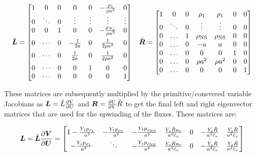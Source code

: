 \documentclass[10pt]{article}
\begin{document}
\begin{flushleft}
\begin{equation*}
    \tilde{\boldsymbol{L}} = \begin{bmatrix}
        1 & 0 & 0 & 0 & 0 & -\frac{\rho_1}{\rho a^2} & 0 \\
        0 & \ddots & 0 & \vdots & \vdots & \vdots & \vdots \\
        0 & 0 & 1 & 0 & 0 & -\frac{\rho_{N_s}}{\rho a^2} & 0 \\[2mm]
        0 & \cdots & 0 & -\frac{1}{2a} & 0 & \frac{1}{2\rho a^2} & 0 \\[2mm]
        0 & \cdots & 0 & \frac{1}{2a} & 0 & \frac{1}{2\rho a^2} & 0 \\[2mm]
        0 & \cdots & 0 & 0 & 1 & 0 & 0 \\
        0 & \cdots & 0 & 0 & 0 & 0 & 1
    \end{bmatrix}
    \hspace{3mm}
    \tilde{\boldsymbol{R}} = \begin{bmatrix}
        1 & 0 & 0 & \rho_1 & \rho_1 & 0 & 0 \\
        0 & \ddots & 0 & \vdots & \vdots & 0 & 0 \\
        0 & \dots & 1 & \rho_\text{NS} & \rho_\text{NS} & 0 & 0 \\
        0 & \dots & 0 & -a & a & 0 & 0  \\
        0 & \dots & 0 & 0 & 0 & 1 & 0 \\
        0 & \dots & 0 & \rho a^2 & \rho a^2 & 0 & 0 \\
        0 & \dots & 0 & 0 & 0 & 0 & 1
    \end{bmatrix}
\end{equation*}

These matrices are subsequently multiplied by the primitive/consvered variable Jacobians as $\boldsymbol{L} = \tilde{L} \frac{\partial V}{\partial U}$ and $\boldsymbol{R} = \frac{\partial U}{\partial V} \tilde{R}$ to get the final left and right eigenvector matrices that are used for the upwinding of the fluxes. These matrices are:

\begin{equation*}
    \boldsymbol{L} = \tilde{\boldsymbol{L}} \frac{\partial \boldsymbol{V}}{\partial \boldsymbol{U}} = \begin{bmatrix}
        1 - \frac{Y_1 p_{\rho_1}}{a^2} & - \frac{Y_1 p_{\rho_s}}{a^2} & - \frac{Y_1 p_{\rho_\text{NS}}}{a^2} & \frac{Y_s \bar{R} u_r}{a^2 \bar{c}_v} & 0 & -\frac{Y_s \bar{R}}{a^2 \bar{c}_v} & \frac{Y_s \bar{R}}{a^2 \bar{c}_v} \\

        - \frac{Y_s p_{\rho_1}}{a^2} & \ddots & - \frac{Y_s p_{\rho_\text{NS}}}{a^2} & \frac{Y_s \bar{R} u_r}{a^2 \bar{c}_v} & 0 & -\frac{Y_s \bar{R}}{a^2 \bar{c}_v} & \frac{Y_s \bar{R}}{a^2 \bar{c}_v} \\


\end{bmatrix}
\end{equation*}
\end{flushleft}
\end{document}
